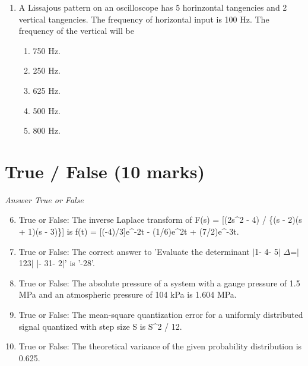 \documentclass[12pt]{article}
\begin{document}
\begin{enumerate}[label=\arabic*.]
\begin{enumerate}[label=(\alph*)]
    \item - 3 - e\^{}1
    \item - 2 - e\^{}-1
    \item 2 + e\^{}-1
    \item - 3 - e\^{}-1
    \item -3 + e\^{}1
\end{enumerate}
\item A Lissajous pattern on an oscilloscope has 5 horinzontal tangencies and 2 vertical
tangencies. The frequency of horizontal input is 100 Hz. The frequency of the vertical
will be
\begin{enumerate}[label=(\alph*)]
    \item 750 Hz.
    \item 250 Hz.
    \item 625 Hz.
    \item 500 Hz.
    \item 800 Hz.
\end{enumerate}
\end{enumerate}

\section*{True / False (10 marks)}
\textit{Answer True or False}
\begin{enumerate}[label=\arabic*.]
\setcounter{enumi}{5}
\item True or False: The inverse Laplace transform of F(s) = [(2s\^{}2 - 4) / \{(s - 2)(s + 1)(s - 3)\}] is f(t) = [(-4)/3]e\^{}-2t - (1/6)e\^{}2t + (7/2)e\^{}-3t.
\item True or False: The correct answer to 'Evaluate the determinant \ensuremath{\vert}1- 4- 5\ensuremath{\vert} \ensuremath{\Delta}=\ensuremath{\vert}123\ensuremath{\vert} \ensuremath{\vert}- 31- 2\ensuremath{\vert}' is '-28'.
\item True or False: The absolute pressure of a system with a gauge pressure of 1.5 MPa and an atmospheric pressure of 104 kPa is 1.604 MPa.
\item True or False: The mean-square quantization error for a uniformly distributed signal quantized with step size S is S\^{}2 / 12.
\item True or False: The theoretical variance of the given probability distribution is 0.625.
\end{enumerate}
\end{document}
